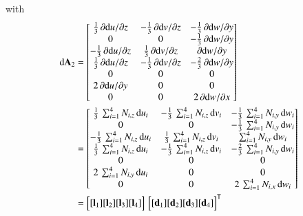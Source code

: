 with  
\begin{subequations}
	\begin{align}
	\mathrm{d} \mathbf{A}_2 & =  \begin{bmatrix}
		\tfrac{1}{3} \, \partial \mathrm{d} u / \partial z &  - \tfrac{1}{3} \, \partial \mathrm{d} v / \partial z & - \tfrac{1}{3} \, \partial \mathrm{d} w / \partial y  \\
		0 & 0 & - \tfrac{1}{3} \, \partial \mathrm{d} w / \partial y  \\
		-\tfrac{1}{3} \, \partial \mathrm{d} u / \partial z  & \tfrac{1}{3} \, \partial \mathrm{d} v / \partial z & \partial \mathrm{d} w / \partial y \\
		\tfrac{1}{3} \, \partial \mathrm{d} u / \partial z & - \tfrac{1}{3} \, \partial \mathrm{d} v / \partial z & - \tfrac{2}{3} \, \partial \mathrm{d} w / \partial y   \\
		0 & 0 & 0  \\
		2 \, \partial \mathrm{d} u / \partial y &  0 & 0 \\
		0 &  0 &  2 \, \partial \mathrm{d} w / \partial x  \end{bmatrix} \notag\\
	& = \begin{bmatrix}
	\tfrac{1}{3} \, \sum\nolimits_{i=1}^4 N_{i,z} \, \mathrm{d} u_i &  - \tfrac{1}{3} \, \sum\nolimits_{i=1}^4 N_{i,z} \, \mathrm{d} v_i & - \tfrac{1}{3} \, \sum\nolimits_{i=1}^4 N_{i,y} \, \mathrm{d} w_i  \\
	0 &  0 & - \tfrac{1}{3} \, \sum\nolimits_{i=1}^4 N_{i,y} \, \mathrm{d} w_i  \\
	-\tfrac{1}{3} \, \sum\nolimits_{i=1}^4 N_{i,z} \, \mathrm{d} u_i  & \tfrac{1}{3} \, \sum\nolimits_{i=1}^4 N_{i,z} \, \mathrm{d} v_i & \sum\nolimits_{i=1}^4 N_{i,y} \, \mathrm{d} w_i \\
	\tfrac{1}{3} \, \sum\nolimits_{i=1}^4 N_{i,z} \, \mathrm{d} u_i  & -\tfrac{1}{3} \, \sum\nolimits_{i=1}^4 N_{i,z} \, \mathrm{d} v_i & -\tfrac{2}{3} \, \sum\nolimits_{i=1}^4 N_{i,y} \, \mathrm{d} w_i   \\
	0 &  0 & 0  \\
	2 \, \sum\nolimits_{i=1}^4 N_{i,y} \, \mathrm{d} u_i &  0 & 0  \\
	0 &  0 &  2 \, \sum\nolimits_{i=1}^4 N_{i,x} \, \mathrm{d} w_i  \end{bmatrix} \notag \\	
	& = \begin{bmatrix}
	[\mathbf{l}_1] [\mathbf{l}_2] [\mathbf{l}_3] [\mathbf{l}_4] 
	\end{bmatrix}  \, \begin{bmatrix} [\mathbf{d}_1] [\mathbf{d}_2] [\mathbf{d}_3] [\mathbf{d}_4] \end{bmatrix}^{\mathsf{T}}

\end{align}
\end{subequations}
